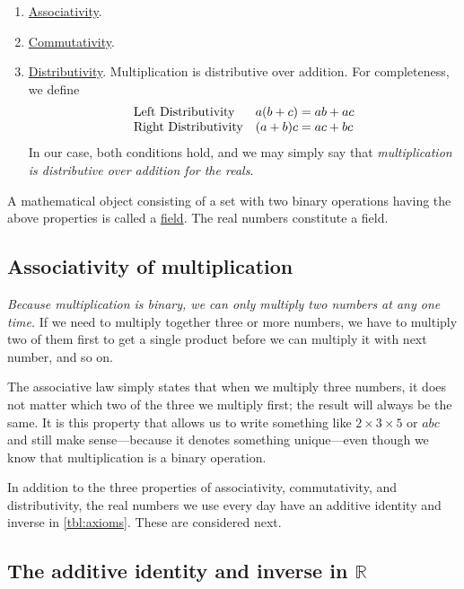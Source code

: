 \documentclass[
  a4paper,
]{article}
\begin{document}
\begin{enumerate}
\item
  \href{https://mathworld.wolfram.com/Associative.html}{Associativity}.
\item
  \href{https://mathworld.wolfram.com/Commutative.html}{Commutativity}.
\item
  \href{https://en.wikipedia.org/wiki/Distributive_property}{Distributivity}.
  Multiplication is distributive over addition. For completeness, we
  define \[
  \begin{array}{l  l}
  \text{Left Distributivity} & a(b+c)=ab+ac\\
  \text{Right Distributivity} & (a+b)c=ac+bc\\
  \end{array}
  \] In our case, both conditions hold, and we may simply say that
  \emph{multiplication is distributive over addition for the reals}.
\end{enumerate}

A mathematical object consisting of a set with two binary operations
having the above properties is called a
\href{https://en.wikipedia.org/wiki/Field_(mathematics)}{field}. The
real numbers constitute a field.

\hypertarget{associativity-of-multiplication}{%
\subsection{Associativity of
multiplication}\label{associativity-of-multiplication}}

\emph{Because multiplication is binary, we can only multiply two numbers
at any one time.} If we need to multiply together three or more numbers,
we have to multiply two of them first to get a single product before we
can multiply it with next number, and so on.

The associative law simply states that when we multiply three numbers,
it does not matter which two of the three we multiply first; the result
will always be the same. It is this property that allows us to write
something like \(2 \times 3 \times 5\) or \(abc\) and still make
sense---because it denotes something unique---even though we know that
multiplication is a binary operation.

In addition to the three properties of associativity, commutativity, and
distributivity, the real numbers we use every day have an additive
identity and inverse in \cref{tbl:axioms}. These are considered next.

\hypertarget{the-additive-identity-and-inverse-in-mathbbr}{%
\subsection{\texorpdfstring{The additive identity and inverse in
\(\mathbb{R}\)}{The additive identity and inverse in \textbackslash mathbb\{R\}}}\label{the-additive-identity-and-inverse-in-mathbbr}}
\end{document}
